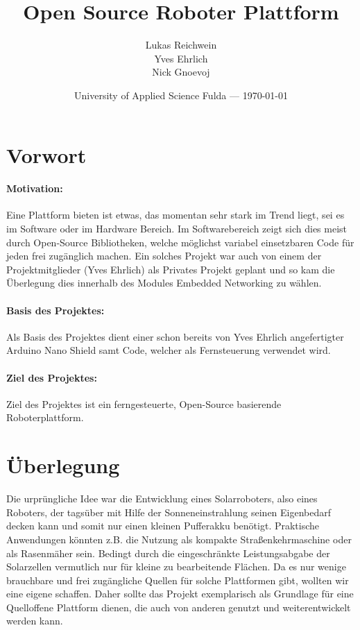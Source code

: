 \documentclass{article}
\title{Open Source Roboter Plattform}
\author{Lukas Reichwein\\ Yves Ehrlich\\ Nick Gnoevoj}
\date{University of Applied Science Fulda --- \today}
\begin{document}
\maketitle %
\tableofcontents %


\section{Vorwort} %
    \paragraph{Motivation: }
    Eine Plattform bieten ist etwas, das momentan sehr stark im Trend liegt, sei es im Software oder im Hardware Bereich. Im Softwarebereich zeigt sich dies meist durch Open-Source Bibliotheken, welche möglichst variabel einsetzbaren Code für jeden frei zugänglich machen.    
    Ein solches Projekt war auch von einem der Projektmitglieder (Yves Ehrlich) als Privates Projekt geplant und so kam die Überlegung dies innerhalb des Modules Embedded Networking zu wählen.
    \paragraph{Basis des Projektes: }
    Als Basis des Projektes dient einer schon bereits von Yves Ehrlich angefertigter Arduino Nano Shield samt Code,
    \cite{nanoGame} welcher als Fernsteuerung verwendet wird. 
    \paragraph{Ziel des Projektes: }	
	Ziel des Projektes ist ein ferngesteuerte, Open-Source basierende Roboterplattform.

\newpage    
\section{Überlegung}%

Die urprüngliche Idee war die Entwicklung eines Solarroboters, also eines Roboters, der tagsüber mit Hilfe der Sonneneinstrahlung seinen Eigenbedarf decken kann und somit nur einen kleinen Pufferakku benötigt.
Praktische Anwendungen könnten z.B. die Nutzung als kompakte Straßenkehrmaschine oder als Rasenmäher sein. Bedingt durch die eingeschränkte Leistungsabgabe der Solarzellen vermutlich nur für kleine zu bearbeitende Flächen.
Da es nur wenige brauchbare und frei zugängliche Quellen für solche Plattformen gibt, wollten wir eine eigene schaffen. Daher sollte das Projekt exemplarisch als Grundlage für eine Quelloffene Plattform dienen, die auch von anderen genutzt und weiterentwickelt werden kann.
\end{document}
